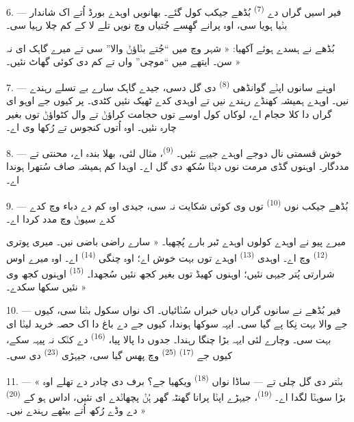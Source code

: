 6. --- فیر اسیں گراں دے  \textsuperscript{(7)} بُڈھے جیکب کول گئے۔
بھانویں اوہدے بورڈ اُتے اک شاندار  بݨیا ہویا سی، اوہ پرانے گھِسے
جُتیاں وچ نویں تلے لا کے کم چلا رہیا سی۔

بُڈھے نے ہسدے ہوئے آکھیا: « شہر وچ میں “جُتے بݨاؤݨ والا” سی تے میرے گاہک ای نہ
سن۔ ایتھے میں “موچی” واں تے کم دی کوئی گھاٹ نئیں۔ »

7. --- اوہنے سانوں اپݨے گوانڈھی  \textsuperscript{(8)} دی گل دسی،
جیدے گاہک سارے بے تسلے رہندے نیں۔ اوہدے  ہمیشہ کھنڈے رہندے نیں تے
اوہدی  کدے ٹھیک نئیں کٹدی۔ پر کیوں جے اوہو ای گراں دا کلا حجام اے،
لوکاں کول اوسے توں حجامت کراؤݨ تے وال کٹواؤݨ توں بغیر چارہ نئیں۔ اوہ اُتوں کنجوس
تے رُکھا وی اے۔

8. --- خوش قسمتی نال دوجے  اوہدے جیہے نئیں۔  \textsuperscript{(9)}، مثال لئی، بھلا بندہ اے، محنتی تے مددگار۔ اوہنوں گڈی
مرمت نوں دیݨا سُکھ دی گل اے۔ اوہدا کم ہمیشہ صاف سُتھرا ہوندا اے۔

9. --- بُڈھے جیکب نوں  \textsuperscript{(10)} توں وی کوئی شکایت نہ
سی، جیدی اوہ کم دے دباء وچ کدے کدے  سیوݨ وچ مدد کردا اے۔

میرے پیو نے اوہدے کولوں اوہدے ٹبر بارے پُچھیا۔ « سارے راضی باضی نیں۔ میری پوتری
 \textsuperscript{(12)} وچ اے۔ اوہدی 
\textsuperscript{(13)} اوہدے توں بہت خوش اے؛ اوہ چنگی 
\textsuperscript{(14)} اے۔ اوہ میرے اوس شرارتی پُتر جیہی نئیں؛ اوہنوں کھیڈ توں
بغیر کجھ نئیں سُجھدا۔  \textsuperscript{(15)} اوہنوں کجھ وی نئیں
سکھا سکدے۔ »

\VUsaut{3.0mm}
\VUsaut{3.0mm}

10. --- فیر بُڈھے نے سانوں گراں دیاں خبراں سُݨائیاں۔ اک نواں سکول بݨنا سی، کیوں
جے  والا بہت نِکا پے گیا سی۔ ایہہ سوکھا ہوندا، کیوں جے
 دے باغ دا اک حصہ خرید لیݨا ای بہت سی۔ وچارے لئی ایہہ بڑا چنگا
رہندا۔ جدوں دا پالا پیا،  \textsuperscript{(16)} دے  کݨک
نہ پیہہ سکے، کیوں جے  \textsuperscript{(17)} 
\textsuperscript{(25)} وچ پھس گیا سی، جیہڑی  \textsuperscript{(23)} دی
سی۔

11. --- « بݨتر دی گل چلی تے — ساڈا نواں  \textsuperscript{(18)}
ویکھیا جے؟ برف دی چادر دے تھلے اوہ بڑا سوہݨا لگدا اے۔ 
\textsuperscript{(19)}، جیہڑے اپݨا پرانا گھنٹہ گھر ہُݨ پچھاݨدے ای نئیں، اداس ہو کے
 \textsuperscript{(20)} دے وڈے رُکھ اُتے بیٹھے رہندے نیں۔ »

